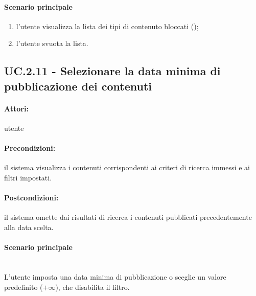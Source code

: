 \documentclass[10pt,a4paper,headinclude,footinclude,hidelinks]{scrreprt} %
\begin{document}
	\paragraph{Scenario principale}
	\begin{enumerate}
	\item l'utente visualizza la lista dei tipi di contenuto bloccati ();
	\item l'utente svuota la lista.
	\end{enumerate}

	\subsection[UC.2.11]{UC.2.11 - Selezionare la data minima di pubblicazione dei contenuti}
	\label{ch:stage:ar:uc:2_11}
	\paragraph{Attori:} utente
	\paragraph{Precondizioni:} il sistema visualizza i contenuti corrispondenti ai criteri di ricerca immessi e ai filtri impostati.
	\paragraph{Postcondizioni:} il sistema omette dai risultati di ricerca i contenuti pubblicati precedentemente alla data scelta.
	\paragraph{Scenario principale} \hfill \\
	L'utente imposta una data minima di pubblicazione o sceglie un valore predefinito ($+\infty$), che disabilita il filtro.
\end{document}
